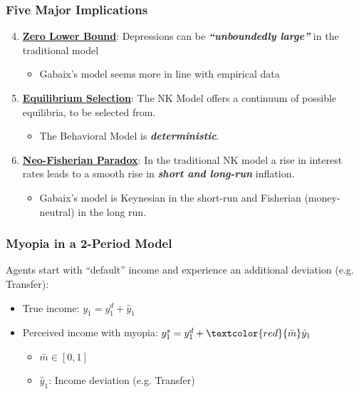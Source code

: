 \documentclass{beamer}
\begin{document}

\begin{frame}
	\frametitle{Five Major Implications}
	\begin{enumerate}
	\setcounter{enumi}{3}
		\item \textbf{\underline{Zero Lower Bound}}: Depressions can be \textit{\textbf{``unboundedly large''}} in the traditional model
		\begin{itemize}
			\item Gabaix's model seems more in line with empirical data
		\end{itemize}
		\vspace{15pt}
		\item \textbf{\underline{Equilibrium Selection}}: The NK Model offers a continuum of possible equilibria, to be selected from.
		\begin{itemize}
			\item The Behavioral Model is \textit{\textbf{deterministic}}.
		\end{itemize}
		\vspace{8pt}
		\item \underline{\textbf{Neo-Fisherian Paradox}}: In the traditional NK model a rise in interest rates leads to a smooth rise in \textit{\textbf{short and long-run}} inflation.
		\begin{itemize}
			\item Gabaix's model is Keynesian in the short-run and Fisherian (money-neutral) in the long run.
		\end{itemize} 
	\end{enumerate}
\end{frame}


\begin{frame}
	\frametitle{Myopia in a 2-Period Model}
	Agents start with ``default'' income and experience an additional deviation (e.g. Transfer):
\vspace{8pt}
	\begin{itemize}
		\item True income: $y_{1}=y_{1}^{d}+\hat y_{1}$
		\item Perceived income with myopia:
	 $y_{1}^{s}=y_{1}^{d}+\textcolor{red}{\bar m}\hat y_{1}$
		\vspace{10pt}
		\begin{itemize}
			\item $\bar m \in [0, 1]$
			\item $\hat y_{1}$: Income deviation (e.g. Transfer)
		\end{itemize}
	 
	\end{itemize}	
\end{frame}
\end{document}
